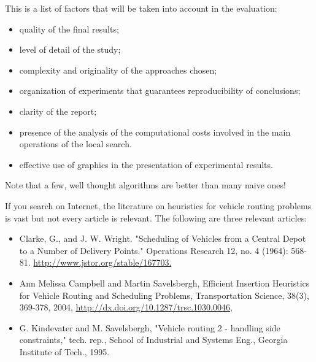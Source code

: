 \begin{remarks} 


\item This is a list of factors that will be taken into account in the
evaluation:


\begin{itemize} 
\item quality of the final results;
\item level of detail of the study;
\item complexity and originality of the approaches chosen;

\item organization of experiments that guarantees reproducibility of
  conclusions;
\item clarity of the report;
\item presence of the analysis of the computational costs involved in
  the main operations of the local search.

\item effective use of graphics in the presentation of experimental results.
\end{itemize}


\item 
Note that a few, well thought algorithms are better than many naive ones!



\item If you search on Internet, the literature on heuristics for
  vehicle routing problems is vast but not every article is
  relevant. The following are three relevant articles:


\begin{itemize}


\item Clarke, G., and J. W. Wright. "Scheduling of Vehicles from a
  Central Depot to a Number of Delivery Points." Operations Research 12,
  no. 4 (1964): 568-81. \url{http://www.jstor.org/stable/167703.}

\item Ann Melissa Campbell and Martin Savelsbergh, Efficient Insertion
  Heuristics for Vehicle Routing and Scheduling Problems, Transportation Science,
38(3), 369-378, 2004, \url{http://dx.doi.org/10.1287/trsc.1030.0046},

  
\item G. Kindevater and M. Savelsbergh, "Vehicle routing 2 - handling
  side constraints," tech. rep., School of Industrial and Systems Eng.,
  Georgia Institute of Tech., 1995.

  
\end{itemize}

\end{remarks}



